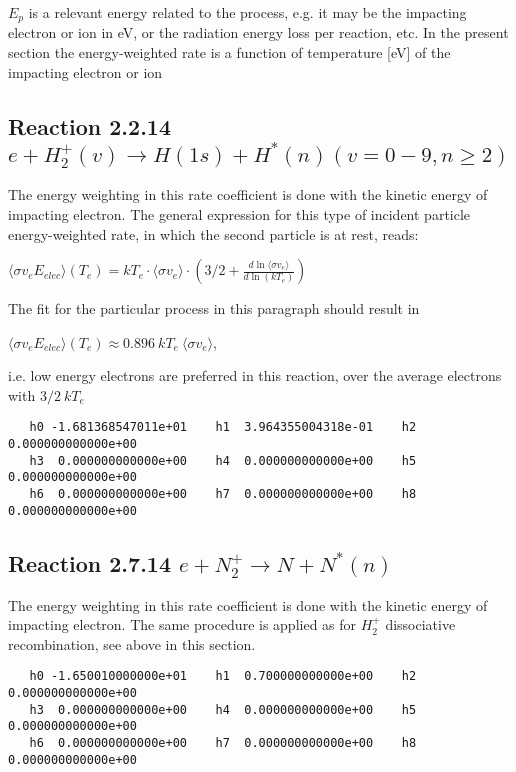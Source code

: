 \documentclass[12pt,dvipdfmx]{article}
\begin{document}
{$E_p$ is a relevant energy related to the process, e.g. it may be the impacting electron or ion in eV,
or the radiation energy loss per reaction, etc.
In the present section
the energy-weighted rate is a function of temperature [eV] of the
impacting electron or ion

\subsection{
Reaction 2.2.14   $e + H_2^+(v) \rightarrow H(1s) + H^*(n)   (v=0-9, n \ge 2) $
}
The energy weighting in this rate coefficient is done with the kinetic energy of
impacting electron. The general expression for this type of incident particle energy-weighted
rate, in which the second particle is at rest, reads:

$\langle\sigma v_e E_{elec}\rangle(T_e) = kT_e \cdot \langle\sigma v_e\rangle \cdot
\left(3/2 + \frac{d \ln \langle\sigma v_e\rangle}{d \ln(kT_e)}\right)$

The fit for the particular process in this paragraph should result in

$\langle\sigma v_e E_{elec}\rangle(T_e) \approx 0.896 ~kT_e ~\langle\sigma v_e\rangle$,

i.e. low energy electrons are preferred in this reaction,
over the average electrons with $3/2~kT_e$


\begin{small}\begin{verbatim}
   h0 -1.681368547011e+01    h1  3.964355004318e-01    h2  0.000000000000e+00
   h3  0.000000000000e+00    h4  0.000000000000e+00    h5  0.000000000000e+00
   h6  0.000000000000e+00    h7  0.000000000000e+00    h8  0.000000000000e+00

\end{verbatim}\end{small}

\subsection{
Reaction 2.7.14   $e + N_2^+ \rightarrow N + N^*(n) $
}
The energy weighting in this rate coefficient is done with the kinetic energy of
impacting electron. The same procedure is applied as for $H_2^+$ dissociative recombination, see above in this section.

\begin{small}\begin{verbatim}
   h0 -1.650010000000e+01    h1  0.700000000000e+00    h2  0.000000000000e+00
   h3  0.000000000000e+00    h4  0.000000000000e+00    h5  0.000000000000e+00
   h6  0.000000000000e+00    h7  0.000000000000e+00    h8  0.000000000000e+00


\end{verbatim}
\end{small}}
\end{document}
